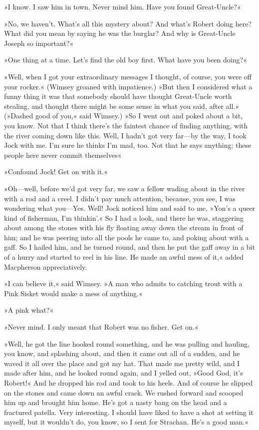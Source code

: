 »I know. I saw him in town. Never mind him. Have you found Great-Uncle?«

»No, we haven't. What's all this mystery about? And what's Robert doing here? What did you mean by saying he was the burglar? And why is Great-Uncle Joseph so important?«

»One thing at a time. Let's find the old boy first. What have you been doing?«

»Well, when I got your extraordinary messages I thought, of course, you were off your rocker.« (Wimsey groaned with impatience.) »But then I considered what a funny thing it was that somebody should have thought Great-Uncle worth stealing, and thought there might be some sense in what you said, after all.« (»Dashed good of you,« said Wimsey.) »So I went out and poked about a bit, you know. Not that I think there's the faintest chance of finding anything, with the river coming down like this. Well, I hadn't got very far—by the way, I took Jock with me. I'm sure he thinks I'm mad, too. Not that he says anything; these people here never commit themselves\longdash«

»Confound Jock! Get on with it.«

»Oh—well, before we'd got very far, we saw a fellow wading about in the river with a rod and a creel. I didn't pay much attention, because, you see, I was wondering what you—Yes. Well! Jock noticed him and said to me, »Yon's a queer kind of fisherman, I'm thinkin'.« So I had a look, and there he was, staggering about among the stones with his fly floating away down the stream in front of him; and he was peering into all the pools he came to, and poking about with a gaff. So I hailed him, and he turned round, and then he put the gaff away in a bit of a hurry and started to reel in his line. He made an awful mess of it,« added Macpherson appreciatively.

»I can believe it,« said Wimsey. »A man who admits to catching trout with a Pink Sisket would make a mess of anything.«

»A pink what?«

»Never mind. I only meant that Robert was no fisher. Get on.«

»Well, he got the line hooked round something, and he was pulling and hauling, you know, and splashing about, and then it came out all of a sudden, and he waved it all over the place and got my hat. That made me pretty wild, and I made after him, and he looked round again, and I yelled out, »Good God, it's Robert!« And he dropped his rod and took to his heels. And of course he slipped on the stones and came down an awful crack. We rushed forward and scooped him up and brought him home. He's got a nasty bang on the head and a fractured patella. Very interesting. I should have liked to have a shot at setting it myself, but it wouldn't do, you know, so I sent for Strachan. He's a good man.«

